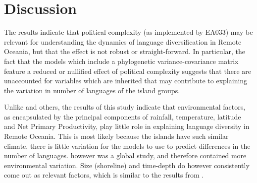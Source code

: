 \documentclass[unnumsec,webpdf,modern,medium]{oup-authoring-template}
\begin{document}






\FloatBarrier
\section{Discussion}
\label{pol_study_discisson}
The results indicate that political complexity (as implemented by EA033) may be relevant for understanding the dynamics of language diversification in Remote Oceania, but that the effect is not robust or straight-forward. In particular, the fact that the models which include a phylogenetic variance-covariance matrix feature a reduced or nullified effect of political complexity suggests that there are unaccounted for variables which are inherited that may contribute to explaining the variation in number of languages of the island groups.

Unlike \citet{hua2019ecological} and others, the results of this study indicate that environmental factors, as encapsulated by the principal components of rainfall, temperature, latitude and Net Primary Productivity, play little role in explaining language diversity in Remote Oceania. This is most likely because the islands have such similar climate, there is little variation for the models to use to predict differences in the number of languages. \citet{hua2019ecological} however was a global study, and therefore contained more environmental variation. Size (shoreline) and time-depth do however consistently come out as relevant factors, which is similar to the results from \citet{gavin2012island}.
\end{document}
